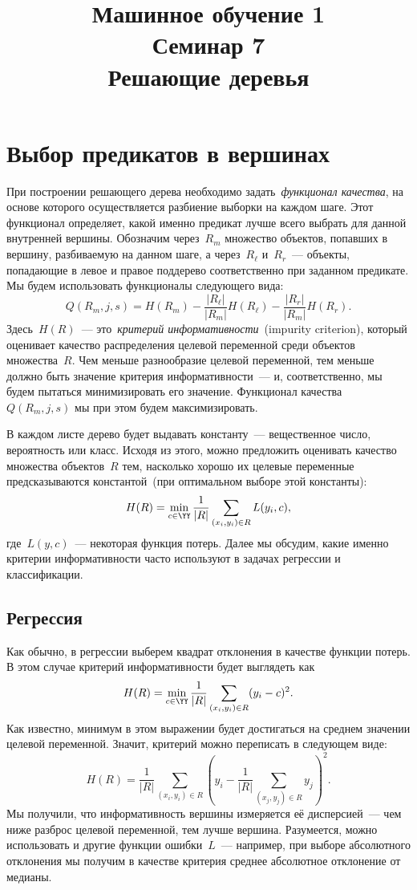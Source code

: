 \documentclass[12pt,fleqn]{article}
\begin{document}
\title{Машинное обучение 1\\Семинар 7\\Решающие деревья}
\author{}
\date{}
\maketitle

\section{Выбор предикатов в вершинах}

При построении решающего дерева необходимо задать~\emph{функционал качества},
на основе которого осуществляется разбиение выборки на каждом шаге.
Этот функционал определяет, какой именно предикат лучше всего выбрать для данной внутренней вершины.
Обозначим через~$R_m$ множество объектов, попавших в вершину, разбиваемую на данном шаге,
а через~$R_\ell$ и~$R_r$~--- объекты, попадающие в левое и правое поддерево соответственно
при заданном предикате.
Мы будем использовать функционалы следующего вида:
\[
    Q(R_m, j, s)
    =
    H(R_m)
    -
    \frac{|R_\ell|}{|R_m|}
    H(R_\ell)
    -
    \frac{|R_r|}{|R_m|}
    H(R_r).
\]
Здесь~$H(R)$~--- это~\emph{критерий информативности}~(impurity criterion),
который оценивает качество распределения целевой переменной среди объектов множества~$R$.
Чем меньше разнообразие целевой переменной, тем меньше должно быть значение критерия информативности~---
и, соответственно, мы будем пытаться минимизировать его значение.
Функционал качества~$Q(R_m, j, s)$ мы при этом будем максимизировать.

В каждом листе дерево будет выдавать константу~--- вещественное число, вероятность
или класс.
Исходя из этого, можно предложить оценивать качество множества объектов~$R$ тем,
насколько хорошо их целевые переменные предсказываются константой~(при оптимальном выборе этой константы):
\[
    H(R)
    =
    \min_{c \in \YY}
    \frac{1}{|R|}
    \sum_{(x_i, y_i) \in R}
        L(y_i, c),
\]
где~$L(y, c)$~--- некоторая функция потерь.
Далее мы обсудим, какие именно критерии информативности часто используют в задачах регрессии и классификации.

\subsection{Регрессия}
Как обычно, в регрессии выберем квадрат отклонения в качестве функции потерь.
В этом случае критерий информативности будет выглядеть как
\[
    H(R)
    =
    \min_{c \in \YY}
    \frac{1}{|R|}
    \sum_{(x_i, y_i) \in R}
        (y_i - c)^2.
\]
Как известно, минимум в этом выражении будет достигаться на среднем значении целевой переменной.
Значит, критерий можно переписать в следующем виде:
\[
    H(R)
    =
    \frac{1}{|R|}
    \sum_{(x_i, y_i) \in R}
    \left(
        y_i
        -
        \frac{1}{|R|}
        \sum_{(x_j, y_j) \in R}
            y_j
    \right)^2.
\]
Мы получили, что информативность вершины измеряется её дисперсией~---
чем ниже разброс целевой переменной, тем лучше вершина.
Разумеется, можно использовать и другие функции ошибки~$L$~---
например, при выборе абсолютного отклонения мы получим в качестве критерия среднее абсолютное отклонение от медианы.
\end{document}
